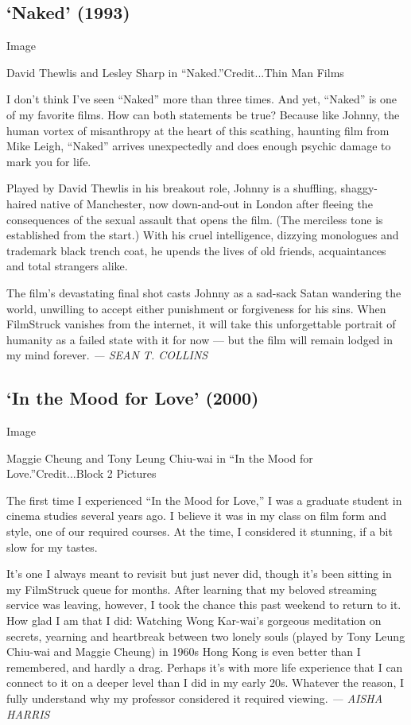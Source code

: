 \hypertarget{naked-1993}{%
\subsection{`Naked' (1993)}\label{naked-1993}}

Image

David Thewlis and Lesley Sharp in ``Naked.''Credit...Thin Man Films

I don't think I've seen ``Naked'' more than three times. And yet,
``Naked'' is one of my favorite films. How can both statements be true?
Because like Johnny, the human vortex of misanthropy at the heart of
this scathing, haunting film from Mike Leigh, ``Naked'' arrives
unexpectedly and does enough psychic damage to mark you for life.

Played by David Thewlis in his breakout role, Johnny is a shuffling,
shaggy-haired native of Manchester, now down-and-out in London after
fleeing the consequences of the sexual assault that opens the film. (The
merciless tone is established from the start.) With his cruel
intelligence, dizzying monologues and trademark black trench coat, he
upends the lives of old friends, acquaintances and total strangers
alike.

The film's devastating final shot casts Johnny as a sad-sack Satan
wandering the world, unwilling to accept either punishment or
forgiveness for his sins. When FilmStruck vanishes from the internet, it
will take this unforgettable portrait of humanity as a failed state with
it for now --- but the film will remain lodged in my mind forever.
\emph{--- SEAN T. COLLINS}

\hypertarget{in-the-mood-for-love-2000}{%
\subsection{`In the Mood for Love'
(2000)}\label{in-the-mood-for-love-2000}}

Image

Maggie Cheung and Tony Leung Chiu-wai in ``In the Mood for
Love.''Credit...Block 2 Pictures

The first time I experienced ``In the Mood for Love,'' I was a graduate
student in cinema studies several years ago. I believe it was in my
class on film form and style, one of our required courses. At the time,
I considered it stunning, if a bit slow for my tastes.

It's one I always meant to revisit but just never did, though it's been
sitting in my FilmStruck queue for months. After learning that my
beloved streaming service was leaving, however, I took the chance this
past weekend to return to it. How glad I am that I did: Watching Wong
Kar-wai's gorgeous meditation on secrets, yearning and heartbreak
between two lonely souls (played by Tony Leung Chiu-wai and Maggie
Cheung) in 1960s Hong Kong is even better than I remembered, and hardly
a drag. Perhaps it's with more life experience that I can connect to it
on a deeper level than I did in my early 20s. Whatever the reason, I
fully understand why my professor considered it required viewing.
\emph{--- AISHA HARRIS}

